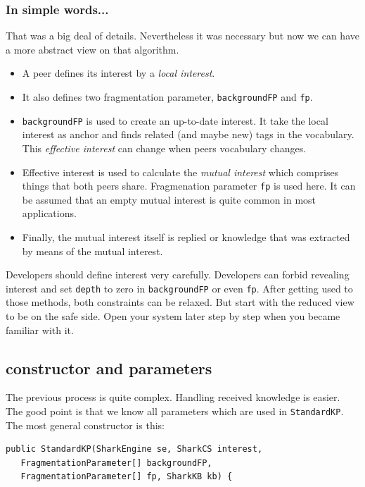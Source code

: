 {\subsubsection{In simple words...}
That was a big deal of details. Nevertheless it was necessary but now we can have a more abstract view on that algorithm. 

\begin{itemize}
\item 
A peer defines its interest by a {\it local interest}.
\item 
It also defines two fragmentation parameter, {\tt backgroundFP} and {\tt fp}. 

\item 
{\tt backgroundFP} is used to create an up-to-date interest. It take the local interest as anchor and finds related (and maybe new) tags in the vocabulary. This {\it effective interest} can change when peers vocabulary changes.

\item
Effective interest is used to calculate the {\it mutual interest} which comprises things that both peers share. Fragmenation parameter {\tt fp} is used here. It can be assumed that an empty mutual interest is quite common in most applications.

\item
Finally, the mutual interest itself is replied or knowledge that was extracted by means of the mutual interest. 
\end{itemize}

Developers should define interest very carefully. Developers can forbid revealing interest and set {\tt depth} to zero in {\tt backgroundFP} or even {\tt fp}. After getting used to those methods, both constraints can be relaxed. But start with the reduced view to be on the safe side. Open your system later step by step when you became familiar with it.

\subsection{constructor and parameters}
The previous process is quite complex. Handling received knowledge is easier. The good point is that we know all parameters which are used in {\tt StandardKP}. The most general constructor is this:

\begin{verbatim}
public StandardKP(SharkEngine se, SharkCS interest, 
   FragmentationParameter[] backgroundFP, 
   FragmentationParameter[] fp, SharkKB kb) {
\end{verbatim}

}
